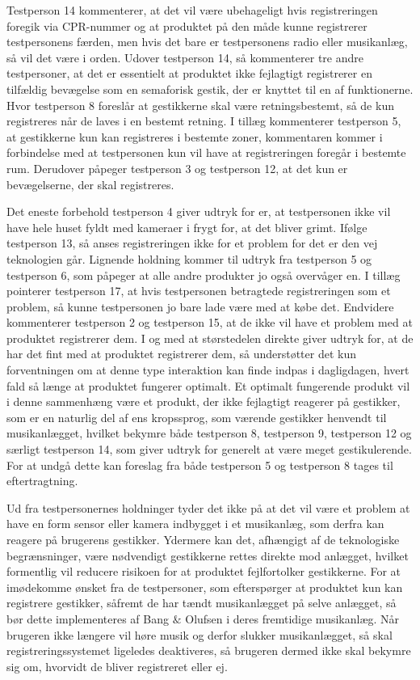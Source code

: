 Testperson 14 kommenterer, at det vil være ubehageligt hvis registreringen foregik via CPR-nummer og at produktet på den måde kunne registrerer testpersonens færden, men hvis det bare er testpersonens radio eller musikanlæg, så vil det være i orden. Udover testperson 14, så kommenterer tre andre testpersoner, at det er essentielt at produktet ikke fejlagtigt registrerer en tilfældig bevægelse som en semaforisk gestik, der er knyttet til en af funktionerne. Hvor testperson 8 foreslår at gestikkerne skal være retningsbestemt, så de kun registreres når de laves i en bestemt retning. I tillæg kommenterer testperson 5, at gestikkerne kun kan registreres i bestemte zoner, kommentaren kommer i forbindelse med at testpersonen kun vil have at registreringen foregår i bestemte rum. Derudover påpeger testperson 3 og testperson 12, at det kun er bevægelserne, der skal registreres. 

Det eneste forbehold testperson 4 giver udtryk for er, at testpersonen ikke vil have hele huset fyldt med kameraer i frygt for, at det bliver grimt. Ifølge testperson 13, så anses registreringen ikke for et problem for det er den vej teknologien går. Lignende holdning kommer til udtryk fra testperson 5 og testperson 6, som påpeger at alle andre produkter jo også overvåger en. I tillæg pointerer testperson 17, at hvis testpersonen betragtede registreringen som et problem, så kunne testpersonen jo bare lade være med at købe det. Endvidere kommenterer testperson 2 og testperson 15, at de ikke vil have et problem med at produktet registrerer dem.\blankline
%
I og med at størstedelen direkte giver udtryk for, at de har det fint med at produktet registrerer dem, så understøtter det kun forventningen om at denne type interaktion kan finde indpas i dagligdagen, hvert fald så længe at produktet fungerer optimalt. Et optimalt fungerende produkt vil i denne sammenhæng være et produkt, der ikke fejlagtigt reagerer på gestikker, som er en naturlig del af ens kropssprog, som værende gestikker henvendt til musikanlægget, hvilket bekymre både testperson 8, testperson 9, testperson 12 og særligt testperson 14, som giver udtryk for generelt at være meget gestikulerende. For at undgå dette kan foreslag fra både testperson 5 og testperson 8 tages til eftertragtning.  

Ud fra testpersonernes holdninger tyder det ikke på at det vil være et problem at have en form sensor eller kamera indbygget i et musikanlæg, som derfra kan reagere på brugerens gestikker. Ydermere kan det, afhængigt af de teknologiske begrænsninger, være nødvendigt gestikkerne rettes direkte mod anlægget, hvilket formentlig vil reducere risikoen for at produktet fejlfortolker gestikkerne. For at imødekomme ønsket fra de testpersoner, som efterspørger at produktet kun kan registrere gestikker, såfremt de har tændt musikanlægget på selve anlægget, så bør dette implementeres af Bang $\&$ Olufsen i deres fremtidige musikanlæg. Når brugeren ikke længere vil høre musik og derfor slukker musikanlægget, så skal registreringssystemet ligeledes deaktiveres, så brugeren dermed ikke skal bekymre sig om, hvorvidt de bliver registreret eller ej.  

